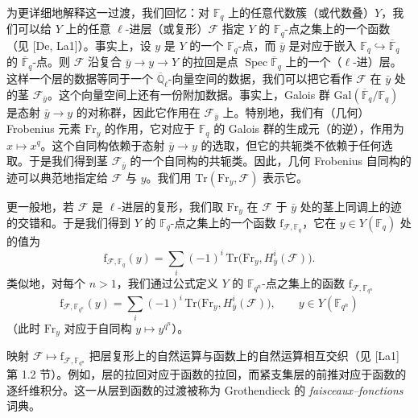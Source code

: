 为更详细地解释这一过渡，我们回忆：对 $\mathbb{F}_q$ 上的任意代数簇（或代数叠）$Y$，我们可以给 $Y$ 上的任意 $\ell$-进层（或复形）$\mathcal{F}$ 指定 $Y$ 的 $\mathbb{F}_q$-点之集上的一个函数（见 [De, La1]）。事实上，设 $y$ 是 $Y$ 的一个
$\mathbb{F}_q$-点，而 $\bar y$ 是对应于嵌入 $\mathbb{F}_q \hookrightarrow \overline{\mathbb{F}}_q$ 的 $\overline{\mathbb{F}}_q$-点。则 $\mathcal{F}$ 沿复合 $\bar y \to y \to Y$ 的拉回是点 $\operatorname{Spec}\overline{\mathbb{F}}_q$ 上的一个（$\ell$-进）层。这样一个层的数据等同于一个 $\overline{\mathbb{Q}}_\ell$-向量空间的数据，我们可以把它看作 $\mathcal{F}$ 在 $\bar y$ 处的茎 $\mathcal{F}_{\bar y}$。这个向量空间上还有一份附加数据。事实上，Galois 群 $\mathrm{Gal}(\overline{\mathbb{F}}_q/\mathbb{F}_q)$ 是态射 $\bar y \to y$ 的对称群，因此它作用在 $\mathcal{F}_{\bar y}$ 上。特别地，我们有（几何）Frobenius 元素 $\mathrm{Fr}_y$ 的作用，它对应于 $\mathbb{F}_q$ 的 Galois 群的生成元（的逆），作用为 $x \mapsto x^q$。这个自同构依赖于态射 $\bar y \to y$ 的选取，但它的共轭类不依赖于任何选取。于是我们得到茎 $\mathcal{F}_{\bar y}$ 的一个自同构的共轭类。因此，几何 Frobenius 自同构的迹可以典范地指定给 $\mathcal{F}$ 与 $y$。我们用 $\mathrm{Tr}(\mathrm{Fr}_y, \mathcal{F})$ 表示它。

更一般地，若 $\mathcal{F}$ 是 $\ell$-进层的复形，我们取 $\mathrm{Fr}_y$ 在 $\mathcal{F}$ 于 $\bar y$ 处的茎上同调上的迹的交错和。于是我们得到 $Y$ 的 $\mathbb{F}_q$-点之集上的一个函数 $\mathrm{f}_{\mathcal{F},\mathbb{F}_q}$，它在 $y\in Y(\mathbb{F}_q)$ 处的值为
\[
\mathrm{f}_{\mathcal{F},\mathbb{F}_q}(y) = \sum_i (-1)^i\,\mathrm{Tr}\bigl(\mathrm{Fr}_y, H^i_{\bar y}(\mathcal{F})\bigr).
\]
类似地，对每个 $n > 1$，我们通过公式定义 $Y$ 的 $\mathbb{F}_{q^n}$-点之集上的函数 $\mathrm{f}_{\mathcal{F},\mathbb{F}_{q^n}}$
\[
\mathrm{f}_{\mathcal{F},\mathbb{F}_{q^n}}(y) = \sum_i (-1)^i\,\mathrm{Tr}\bigl(\mathrm{Fr}_y, H^i_{\bar y}(\mathcal{F})\bigr), \qquad y\in Y(\mathbb{F}_{q^n})
\]
（此时 $\mathrm{Fr}_y$ 对应于自同构 $y \mapsto y^{q^n}$）。

映射 $\mathcal{F} \mapsto \mathrm{f}_{\mathcal{F},\mathbb{F}_{q^n}}$ 把层复形上的自然运算与函数上的自然运算相互交织（见 [La1] 第 1.2 节）。例如，层的拉回对应于函数的拉回，而紧支集层的前推对应于函数的逐纤维积分。这一从层到函数的过渡被称为 Grothendieck 的 \textit{faisceaux--fonctions} 词典。

